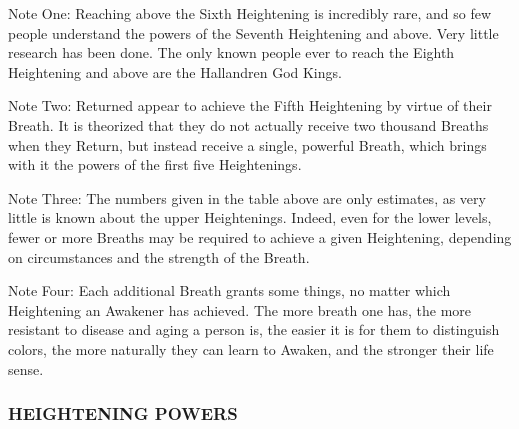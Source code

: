 Note One: Reaching above the Sixth Heightening is incredibly rare, and so few people understand the powers of the Seventh Heightening and above. Very little research has been done. The only known people ever to reach the Eighth Heightening and above are the Hallandren God Kings.

Note Two: Returned appear to achieve the Fifth Heightening by virtue of their Breath. It is theorized that they do not actually receive two thousand Breaths when they Return, but instead receive a single, powerful Breath, which brings with it the powers of the first five Heightenings.

Note Three: The numbers given in the table above are only estimates, as very little is known about the upper Heightenings. Indeed, even for the lower levels, fewer or more Breaths may be required to achieve a given Heightening, depending on circumstances and the strength of the Breath.

Note Four: Each additional Breath grants some things, no matter which Heightening an Awakener has achieved. The more breath one has, the more resistant to disease and aging a person is, the easier it is for them to distinguish colors, the more naturally they can learn to Awaken, and the stronger their life sense.

\subsubsection*{HEIGHTENING POWERS}

